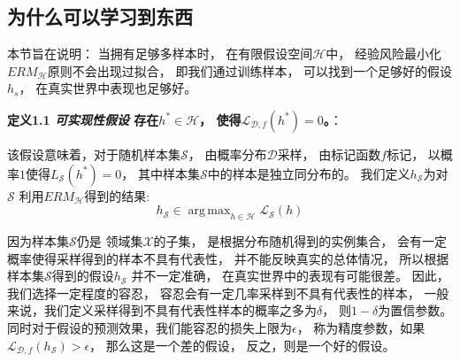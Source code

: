 \documentclass[UTF8]{ctexart}
\DeclareMathOperator*{\argmax}{arg\,max}
\begin{document}
\subsection{为什么可以学习到东西}
本节旨在说明：
当拥有足够多样本时，
在有限假设空间$\mathcal{H}$中，
经验风险最小化${ERM}_{\mathcal{H}}$原则不会出现过拟合，
即我们通过训练样本，
可以找到一个足够好的假设$h_s$，
在真实世界中表现也足够好。


\textbf{定义1.1 \textit{可实现性假设}
存在$h^*\in\mathcal{H}$，
使得$\mathcal{L}_{\mathcal{D},f}(h^*)=0$。}：


该假设意味着，对于随机样本集$\mathcal{S}$，
由概率分布$\mathcal{D}$采样，
由标记函数$f$标记，
以概率$1$使得$L_{\mathcal{S}}(h^*)=0$，
其中样本集$\mathcal{S}$中的样本是独立同分布的。
我们定义$h_{\mathcal{S}}$为对$\mathcal{S}$
利用${ERM}_{\mathcal{H}}$得到的结果:
$$
h_{\mathcal{S}}\in 
\argmax_{h\in\mathcal{H}}
\mathcal{L}_{\mathcal{S}}(h)
$$

因为样本集$\mathcal{S}$仍是
领域集$\mathcal{X}$的子集，
是根据分布随机得到的实例集合，
会有一定概率使得采样得到的样本不具有代表性，
并不能反映真实的总体情况，
所以根据样本集$\mathcal{S}$得到的假设$h_{\mathcal{S}}$
并不一定准确，
在真实世界中的表现有可能很差。
因此，我们选择一定程度的容忍，
容忍会有一定几率采样到不具有代表性的样本，
一般来说，我们定义采样得到不具有代表性样本的概率之多为$\delta$，
则$1-\delta$为置信参数。
同时对于假设的预测效果，我们能容忍的损失上限为$\epsilon$，
称为精度参数，如果
$\mathcal{L}_{\mathcal{D},f}(h_{\mathcal{S}})>\epsilon$，
那么这是一个差的假设，
反之，则是一个好的假设。
\end{document}
